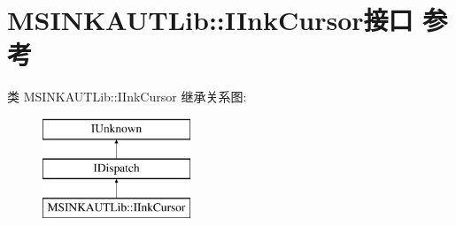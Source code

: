 \hypertarget{interface_m_s_i_n_k_a_u_t_lib_1_1_i_ink_cursor}{}\section{M\+S\+I\+N\+K\+A\+U\+T\+Lib\+:\+:I\+Ink\+Cursor接口 参考}
\label{interface_m_s_i_n_k_a_u_t_lib_1_1_i_ink_cursor}
类 M\+S\+I\+N\+K\+A\+U\+T\+Lib\+:\+:I\+Ink\+Cursor 继承关系图\+:\begin{figure}[H]
\begin{center}
\leavevmode
\includegraphics[height=3.000000cm]{interface_m_s_i_n_k_a_u_t_lib_1_1_i_ink_cursor}
\end{center}
\end{figure}
